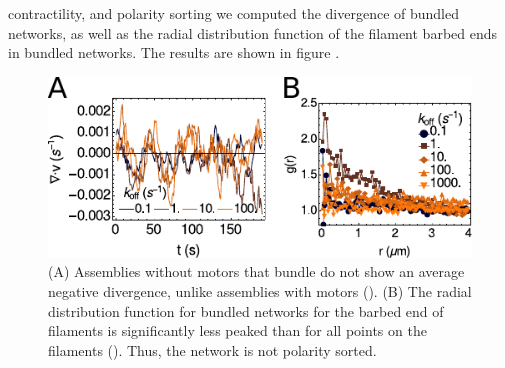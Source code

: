 \documentclass[12pt]{article} \usepackage{times} \usepackage{graphicx}
\begin{document}
    contractility, and polarity sorting we computed the divergence of bundled
    networks, as well as the radial distribution function of the filament
    barbed ends in bundled networks. The results are shown in figure
    .  \begin{figure}[H] \centering
      \includegraphics[width=\textwidth]{figs/bundling/bundling_supplement.pdf}
      \caption{\label{fig:bundling_supp} (A) Assemblies without motors that
      bundle do not show an average negative divergence, unlike assemblies with
      motors ().  (B) The radial distribution function for
      bundled networks for the barbed end of filaments is significantly less
      peaked than for all points on the filaments (). Thus,
      the network is not polarity sorted.  } \end{figure} 
\end{document}
